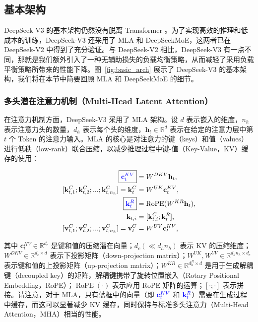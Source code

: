 \documentclass[lang=cn,a4paper,newtx]{elegantpaper}
\newcommand{\dsvii}{DeepSeek-V2}
\newcommand{\dsattn}{MLA}
\newcommand{\dsmoe}{DeepSeekMoE}
\newcommand{\dsviii}{DeepSeek-V3}
\begin{document}
\subsection{基本架构}

\dsviii{} 的基本架构仍然没有脱离 Transformer 。为了实现高效的推理和低成本的训练，\dsviii{} 还采用了 \dsattn{} 和 \dsmoe{}，这两者已在 \dsvii{} 中得到了充分验证。与 \dsvii{} 相比，\dsviii{} 有一点不同，那就是我们额外引入了一种无辅助损失的负载均衡策略，从而减轻了采用负载平衡策略所带来的性能下降。图~\ref{fig:basic_arch} 展示了 \dsviii{} 的基本架构，我们将在本节中简要回顾 MLA 和 DeepSeekMoE 的细节。

\subsubsection{多头潜在注意力机制（Multi-Head Latent Attention）}

在注意力机制方面，\dsviii{} 采用了 \dsattn{} 架构。设 $d$ 表示嵌入的维度，$n_h$ 表示注意力头的数量，$d_h$ 表示每个头的维度，$\mathbf{h}_{t} \in \mathbb{R}^{d}$ 表示在给定的注意力层中第 $t$ 个 Token 的注意力输入。\dsattn{} 的核心是对注意力的键（keys）和值（values）进行低秩（low-rank）联合压缩，以减少推理过程中键-值（Key-Value，KV）缓存的使用：

\begin{align}
    \boxed{\color{blue} \mathbf{c}_{t}^{KV}} &= W^{DKV} \mathbf{h}_{t}, \\
    [\mathbf{k}_{t, 1}^{C};\mathbf{k}_{t, 2}^{C};...;\mathbf{k}_{t, n_{h}}^{C}] = \mathbf{k}_{t}^{C} &= W^{UK} \mathbf{c}_{t}^{KV}, \\
    \boxed{\color{blue}\mathbf{k}_{t}^{R}} &= \operatorname{RoPE}({W^{KR}} \mathbf{h}_{t}), \\
    \mathbf{k}_{t, i} &= [\mathbf{k}_{t, i}^{C}; \mathbf{k}_{t}^{R}], \\
    [\mathbf{v}_{t, 1}^{C};\mathbf{v}_{t, 2}^{C};...;\mathbf{v}_{t, n_{h}}^{C}] = \mathbf{v}_{t}^{C} &= W^{UV} \mathbf{c}_{t}^{KV}, 
\end{align}

其中 $\mathbf{c}_{t}^{KV} \in \mathbb{R}^{d_c}$ 是键和值的压缩潜在向量；$d_c (\ll d_h n_h)$ 表示 KV 的压缩维度；$W^{DKV} \in \mathbb{R}^{d_c \times d}$ 表示下投影矩阵（down-projection matrix）；$W^{UK}, W^{UV} \in \mathbb{R}^{d_h n_h \times d_c}$ 表示键和值的上投影矩阵（up-projection matrix）；$W^{KR} \in \mathbb{R}^{d_h^R \times d}$ 是用于生成解耦键（decoupled key）的矩阵，解耦键携带了旋转位置嵌入（Rotary Positional Embedding，RoPE）；$\operatorname{RoPE}(\cdot)$ 表示应用 RoPE 矩阵的运算；$[\cdot;\cdot]$ 表示拼接。请注意，对于 MLA，只有蓝框中的向量（即 $\color{blue} \mathbf{c}_{t}^{KV}$ 和 $\color{blue}\mathbf{k}_{t}^{R}$）需要在生成过程中缓存，而这可以显著减少 KV 缓存，同时保持与标准多头注意力（Multi-Head Attention，MHA）相当的性能。
\end{document}
